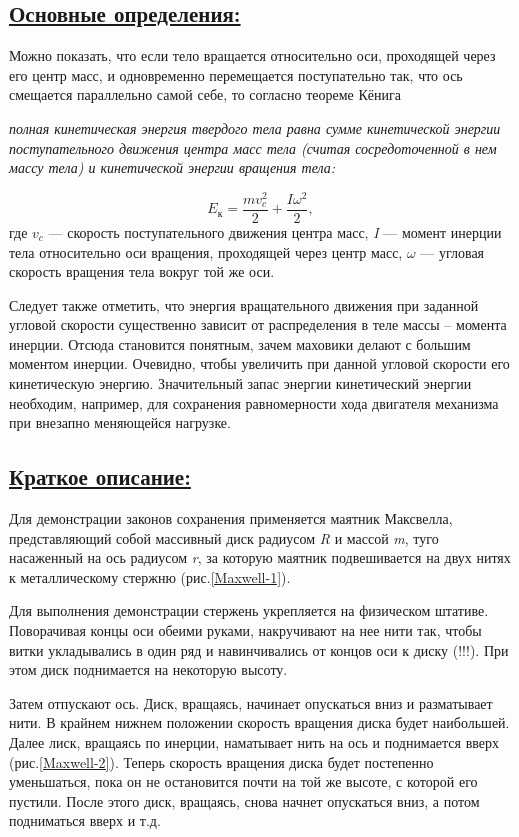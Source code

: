 \documentclass[14pt,a4paper,oneside]{extarticle}	%
\begin{document}
\newpage
\subsection*{\underline{Основные определения:}}
		
Можно показать, что если тело вращается относительно оси, проходящей через его центр масс, и одновременно перемещается поступательно так, что ось смещается параллельно самой себе, то согласно теореме Кёнига
\begin{flushleft}
\textit{полная кинетическая энергия твердого тела равна сумме кинетической энергии поступательного движения центра масс тела (считая сосредоточенной в нем массу тела) и кинетической энергии вращения тела:}
\end{flushleft}
$$ E_\text{к} = \frac{mv_c^2}{2} + \frac{I\omega^2}{2}, $$
где $ v_c $ — скорость поступательного движения центра масс, \textit{I} — момент инерции тела относительно оси вращения, проходящей через центр масс, $ \omega $ — угловая скорость вращения тела вокруг той же оси.

Следует также отметить, что энергия вращательного движения при заданной угловой скорости существенно зависит от распределения в теле массы – момента инерции.
Отсюда становится понятным, зачем маховики делают с большим моментом инерции.
Очевидно, чтобы увеличить при данной угловой скорости его кинетическую энергию.
Значительный запас энергии кинетический энергии необходим, например, для сохранения равномерности хода двигателя механизма при внезапно меняющейся нагрузке.
	
\newpage
\subsection*{\underline{Краткое описание:}}


Для демонстрации законов сохранения применяется маятник Максвелла, представляющий собой массивный диск радиусом \textit{R} и массой \textit{m}, туго насаженный на ось радиусом \textit{r}, за которую маятник подвешивается на двух нитях к металлическому стержню (рис.\ref{Maxwell-1}).

Для выполнения демонстрации стержень укрепляется на физическом штативе.
Поворачивая концы оси обеими руками, накручивают на нее нити так, чтобы витки укладывались в один ряд и навинчивались от концов оси к диску (!!!).
При этом диск поднимается на некоторую высоту.

Затем отпускают ось.
Диск, вращаясь, начинает опускаться вниз и разматывает нити.
В крайнем нижнем положении скорость вращения диска будет наибольшей.
Далее лиск, вращаясь по инерции, наматывает нить на ось и поднимается вверх (рис.\ref{Maxwell-2}).
Теперь скорость вращения диска будет постепенно уменьшаться, пока он не остановится почти на той же высоте, с которой его пустили.
После этого диск, вращаясь, снова начнет опускаться вниз, а потом подниматься вверх и т.д.
\end{document}
